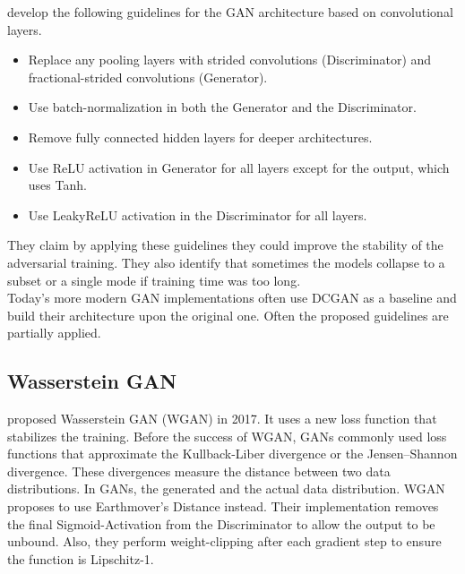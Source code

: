 \citeauthor{radford2016dcgan} develop the following guidelines for the GAN architecture based on convolutional layers.

\begin{itemize}
    \item Replace any pooling layers with strided convolutions (Discriminator) and fractional-strided convolutions (Generator).
    \item Use batch-normalization in both the Generator and the Discriminator.
    \item Remove fully connected hidden layers for deeper architectures.
    \item Use ReLU activation in Generator for all layers except for the output, which uses Tanh.
    \item Use LeakyReLU activation in the Discriminator for all layers.
\end{itemize}


They claim by applying these guidelines they could improve the stability of the adversarial training. They also identify that sometimes the models collapse to a subset or a single mode if training time was too long.\\

Today's more modern GAN implementations often use DCGAN as a baseline and build their architecture upon the original one. Often the proposed guidelines are partially applied.\\

\subsection{Wasserstein GAN}

\citeauthor{arjovsky2017wgan} proposed Wasserstein GAN (WGAN) in 2017. It uses a new loss function that stabilizes the training. Before the success of WGAN, GANs commonly used loss functions that approximate the Kullback-Liber divergence or the Jensen–Shannon divergence. These divergences measure the distance between two data distributions. In GANs, the generated and the actual data distribution. WGAN proposes to use Earthmover's Distance instead. Their implementation removes the final Sigmoid-Activation from the Discriminator to allow the output to be unbound. Also, they perform weight-clipping after each gradient step to ensure the function is Lipschitz-1.\\


